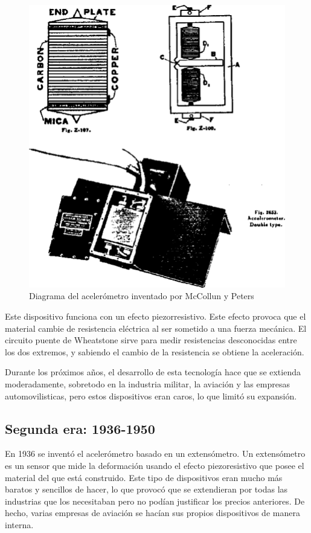 \documentclass[12pt]{book}
\numberwithin{equation}{section}
\begin{document}
\begin{figure}[h]
    \centering
    \includegraphics[scale=0.2]{mcculling.png}
    \caption{Diagrama del acelerómetro inventado por McCollun y Peters}
    \label{fig:wheatstone}
\end{figure}

Este dispositivo funciona con un efecto piezorresistivo. Este efecto provoca que el material cambie de resistencia eléctrica al ser sometido a una fuerza mecánica. El circuito puente de Wheatstone sirve para medir resistencias desconocidas entre los dos extremos, y sabiendo el cambio de la resistencia se obtiene la aceleración.

Durante los próximos años, el desarrollo de esta tecnología hace que se extienda moderadamente, sobretodo en la industria militar, la aviación y las empresas automovilisticas, pero estos dispositivos eran caros, lo que limitó su expansión.

\subsection{Segunda era: 1936-1950}
En 1936\cite{50yearsof} se inventó el acelerómetro basado en un extensómetro. Un extensómetro es un sensor que mide la deformación usando el efecto piezoresistivo que posee el material del que está construido.  Este tipo de dispositivos eran mucho más baratos y sencillos de hacer, lo que provocó que se extendieran por todas las industrias que los necesitaban pero no podían justificar los precios anteriores. De hecho, varias empresas de aviación se hacían sus propios dispositivos de manera interna.
\end{document}
